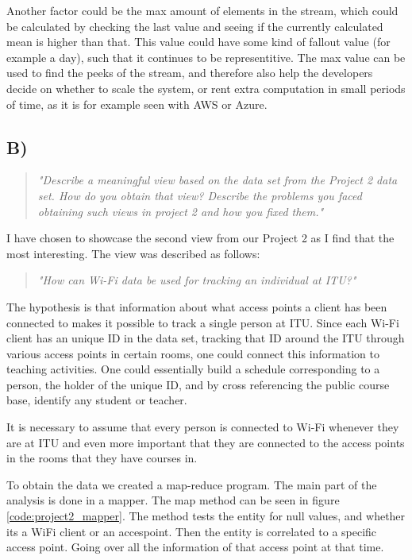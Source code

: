 Another factor could be the max amount of elements in the stream, which could be calculated by checking the last value and seeing if the currently calculated mean is higher than that. This value could have some kind of fallout value (for example a day), such that it continues to be representitive. The max value can be used to find the peeks of the stream, and therefore also help the developers decide on whether to scale the system, or rent extra computation in small periods of time, as it is for example seen with AWS or Azure.

\subsection{B)}
\begin{quote}
		\textit{"Describe	a	meaningful	view	based	on	the	data	set	from	the	Project	2	data	set.	How	do	you	obtain	that	view?	Describe	the	problems	you	faced	obtaining	such	views	in	project	2	and	how	you	fixed	them."}
\end{quote}
I have chosen to showcase the second view from our Project 2 as I find that the most interesting. The view was described as follows: 
\begin{quote}
	\textit{"How can Wi-Fi data be used for tracking an individual at ITU?"}
\end{quote}
The hypothesis is that information about what access points a client has been connected to makes it possible to track a single person at ITU. Since each Wi-Fi client has an unique ID in the data set, tracking that ID around the ITU through various access points in certain rooms, one could connect this information to teaching activities. One could essentially build a schedule corresponding to a person, the holder of the unique ID, and by cross referencing the public course base, identify any student or teacher. 


It is necessary to assume that every person is connected to Wi-Fi whenever they are at ITU and even more important that they are connected to the access points in the rooms that they have courses in. 

To obtain the data we created a map-reduce program. The main part of the analysis is done in a mapper. The map method can be seen in figure \ref{code:project2_mapper}. The method tests the entity for null values, and whether its a WiFi client or an accespoint. Then the entity is correlated to a specific access point. Going over all the information of that access point at that time. 


